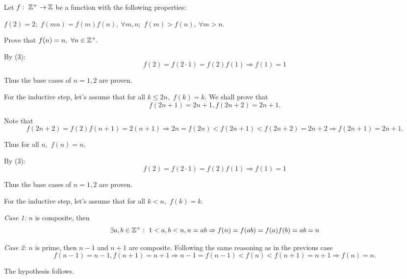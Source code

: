 \documentclass{article}
\begin{document}
\begin{problem}
    Let $f:\ \mathbb Z^+ \rightarrow \mathbb Z$ be a function with the following properties: 
    \begin{enumerate}[topsep=0pt, partopsep=0pt, itemsep=0pt]
        \ii $f(2) = 2;$
        \ii $f(mn) = f(m)f(n),\ \forall m, n;$ 
        \ii $f(m) > f(n),\ \forall m > n.$ 
    \end{enumerate}
    
    Prove that $f(n) = n,\ \forall n \in \mathbb Z^+.$
\end{problem}

\begin{soln}
    By (3): 
    \[
        f(2) = f(2 \cdot 1) = f(2) f(1) \Rightarrow f(1) = 1
    \]

    Thus the base cases of $n=1,2$ are proven.
    
    For the inductive step, let's assume that for all $k \le 2n,$ $f(k) = k.$ We shall prove that 
    \[
        f(2n+1) = 2n+1, f(2n+2) = 2n+1.
    \]

    Note that
    \[
        f(2n+2) = f(2)f(n+1) = 2(n+1) \Rightarrow 2n = f(2n) < f(2n+1) < f(2n+2) = 2n+2 \Rightarrow f(2n+1) = 2n+1.
    \]
    
    Thus for all $n,$ $f(n) = n.$
\end{soln}

\begin{soln}
    By (3): 
    \[
        f(2) = f(2 \cdot 1) = f(2) f(1) \Rightarrow f(1) = 1
    \]
    
    Thus the base cases of $n=1,2$ are proven.

    For the inductive step, let's assume that for all $k < n,$ $f(k) = k.$
    
    \textit{Case 1:} $n$ is composite, then 
    \[
        \exists a,b \in \ZZ^+:\ 1 < a, b < n, n = ab \Rightarrow f(n) = f(ab) = f(a)f(b) = ab = n
    \]

    \textit{Case 2:} $n$ is prime, then $n-1$ and $n+1$ are composite. Following the same reasoning as in the previous case
    \[
        f(n-1)= n-1, f(n+1)=n+1 \Rightarrow n-1=f(n-1)<f(n)<f(n+1) = n+1 \Rightarrow f(n) = n.
    \]

    The hypothesis follows.
\end{soln}
\end{document}
